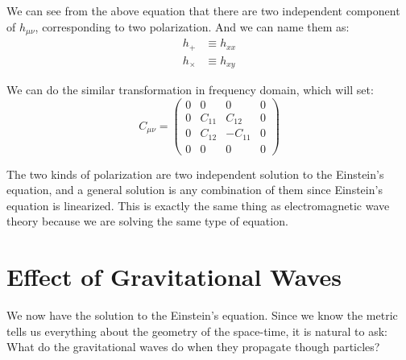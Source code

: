 \documentclass[10pt]{article}
\begin{document}
We can see from the above equation that there are two independent component of $ h_{\mu\nu} $, corresponding to two polarization. And we can name them as:
\begin{equation}\label{eq: polarization}
\begin{aligned}
h_{+} &\equiv h_{xx}\\
h_{\times} &\equiv h_{xy}
\end{aligned}
\end{equation}

We can do the similar transformation in frequency domain, which will set:
\begin{equation}\label{key}
C_{\mu\nu}=
\begin{pmatrix}
0 & 0 & 0 & 0 \\ 
0 & C_{11} & C_{12} & 0 \\ 
0 & C_{12} & -C_{11} & 0 \\ 
0 & 0 & 0 & 0
\end{pmatrix}
\end{equation}

The two kinds of polarization are two independent solution to the Einstein's equation, and a general solution is any combination of them since Einstein's equation is linearized. This is exactly the same thing as electromagnetic wave theory  because we are solving the same type of equation.

\section{Effect of Gravitational Waves}
We now have the solution to the Einstein's equation. Since we know the metric tells us everything about the geometry of the space-time, it is natural to ask: What do the gravitational waves do when they propagate though particles?
\end{document}
